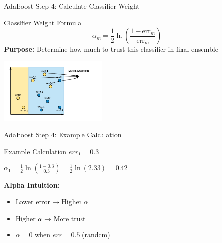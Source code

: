 \documentclass[10pt]{beamer}
\newcommand{\fitpic}[1]{\begin{adjustbox}{max width=\linewidth, max totalheight=0.78\textheight}#1\end{adjustbox}}
\begin{document}
\begin{frame}{AdaBoost Step 4: Calculate Classifier Weight}
\begin{definitionbox}{Classifier Weight Formula}
$$\alpha_m = \frac{1}{2}\ln\left(\frac{1 - \text{err}_m}{\text{err}_m}\right)$$
\textbf{Purpose:} Determine how much to trust this classifier in final ensemble
\end{definitionbox}

\begin{center}
\fitpic{\includegraphics[width = 0.4\textwidth]{../assets/ensemble/diagrams/ada_iter1_misclassify}}
\end{center}
\end{frame}

\begin{frame}{AdaBoost Step 4: Example Calculation}
\begin{examplebox}{Example Calculation}
$err_1 = 0.3$

$\alpha_1 = \frac{1}{2}\ln\left(\frac{1-0.3}{0.3}\right) = \frac{1}{2}\ln(2.33) = 0.42$
\end{examplebox}

\begin{keypointsbox}
\textbf{Alpha Intuition:}
\begin{itemize}
\item Lower error → Higher $\alpha$
\item Higher $\alpha$ → More trust
\item $\alpha = 0$ when $err = 0.5$ (random)
\end{itemize}
\end{keypointsbox}
\end{frame}
\end{document}
